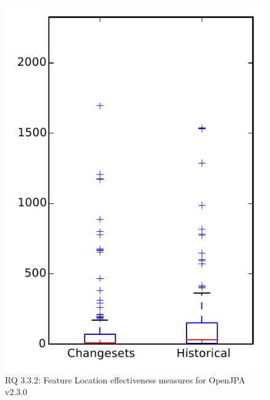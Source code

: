 
\begin{figure}
\centering
\includegraphics[height=0.4\textheight]{figures/flt/rq2_openjpa}
\caption{RQ 3.3.2: Feature Location effectiveness measures for OpenJPA v2.3.0}
\label{fig:flt:rq2:openjpa}
\end{figure}
